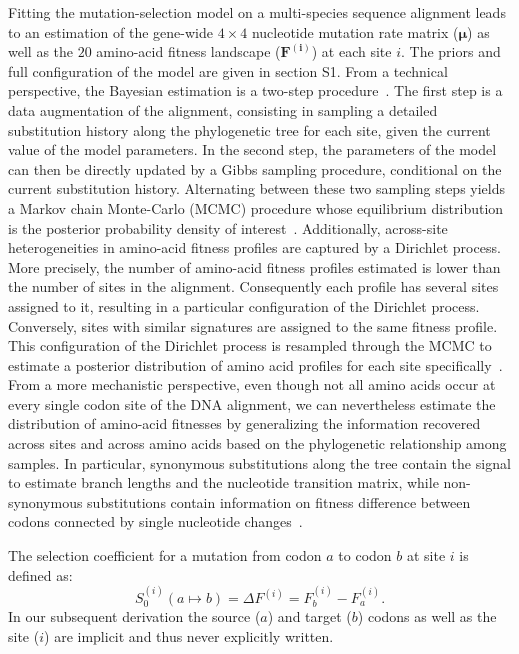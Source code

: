 \documentclass{article}
\newcommand{\UniDimArray}[1]{\bm{#1}}
\newcommand{\Sphy}{S_{0}}
\begin{document}
    Fitting the mutation-selection model on a multi-species sequence alignment leads to an estimation of the gene-wide $4 \times 4$ nucleotide mutation rate matrix ($\UniDimArray{\mu}$) as well as the $20$ amino-acid fitness landscape ($\UniDimArray{F^{(i)}}$) at each site $i$.
    The priors and full configuration of the model are given in section S1.
    From a technical perspective, the Bayesian estimation is a two-step procedure~\cite{rodrigue_bayesian_2008}.
    The first step is a data augmentation of the alignment, consisting in sampling a detailed substitution history along the phylogenetic tree for each site, given the current value of the model parameters.
    In the second step, the parameters of the model can then be directly updated by a Gibbs sampling procedure, conditional on the current substitution history.
    Alternating between these two sampling steps yields a Markov chain Monte-Carlo (MCMC) procedure whose equilibrium distribution is the posterior probability density of interest~\cite{lartillot_bayesian_2004, rodrigue_bayesian_2008}.
    Additionally, across-site heterogeneities in amino-acid fitness profiles are captured by a Dirichlet process.
    More precisely, the number of amino-acid fitness profiles estimated is lower than the number of sites in the alignment.
    Consequently each profile has several sites assigned to it, resulting in a particular configuration of the Dirichlet process.
    Conversely, sites with similar signatures are assigned to the same fitness profile.
    This configuration of the Dirichlet process is resampled through the MCMC to estimate a posterior distribution of amino acid profiles for each site specifically~\cite{rodrigue_mutationselection_2010, lartillot_inference_2013}.
    From a more mechanistic perspective, even though not all amino acids occur at every single codon site of the DNA alignment, we can nevertheless estimate the distribution of amino-acid fitnesses by generalizing the information recovered across sites and across amino acids based on the phylogenetic relationship among samples.
    In particular, synonymous substitutions along the tree contain the signal to estimate branch lengths and the nucleotide transition matrix, while non-synonymous substitutions contain information on fitness difference between codons connected by single nucleotide changes~\cite{rodrigue_mutationselection_2010}.

    The selection coefficient for a mutation from codon $a$ to codon $b$ at site $i$ is defined as:
    \begin{equation}
        \Sphy^{(i)} (a \mapsto b) = \Delta F^{(i)} = F^{(i)}_{b} - F^{(i)}_{a}.
    \end{equation}
    In our subsequent derivation the source ($a$) and target ($b$) codons as well as the site ($i$) are implicit and thus never explicitly written.
\end{document}
